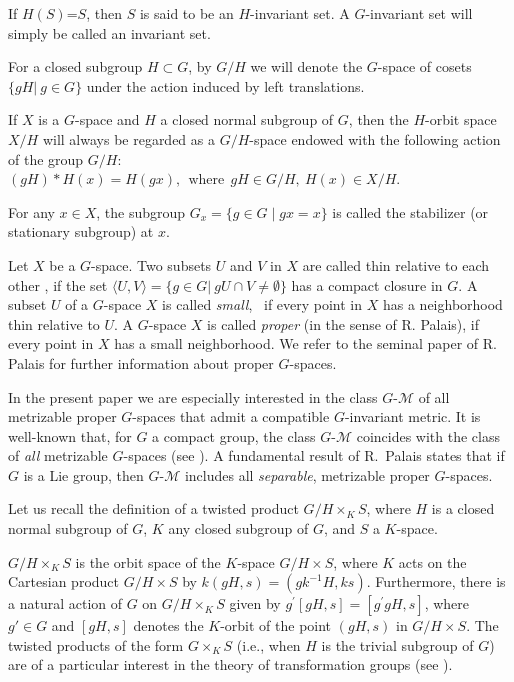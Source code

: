 \documentclass{amsart}
\begin{document}
If $H(S)$=$S$, then $S$ is said to be an $H$-invariant set. A  $G$-invariant set will simply be called an invariant set.  

For a closed subgroup $H \subset G$, by $G/H$ we will denote the $G$-space 
of cosets $\{gH | \ g\in G\}$ under the action induced by left translations.

If $X$ is a $G$-space and $H$  a closed normal subgroup of $G$, then the $H$-orbit space $X/H$  will always be regarded as a  $G/H$-space endowed with the following action of the group $G/H$:
$(gH)*H(x)=H(gx), \ \ \text{where} \ \ gH\in G/H, \ H(x)\in X/H$.

For any $x\in X$, the subgroup   $G_x =\{g\in G   \mid  gx=x\}$ is called  the stabilizer (or stationary subgroup) at $x$.

\smallskip

 Let  $X$ be  a $G$-space. Two subsets  $U$ and $V$ in  $X$  are called  thin relative to each other   \cite[Definition 1.1.1]{pal:61},  if the set 
$\langle U,V\rangle=\{g\in G | \ gU\cap V\ne \emptyset\}$
    has  a compact closure in $G$. 
   A subset $U$ of a $G$-space $X$ is called {\it small}, \ if  every point in $X$ has a neighborhood thin relative to $U$. A $G$-space $X$ 
is called  {\it  proper} (in the sense of R. Palais),  if   every point in  $X$ has a small neighborhood. We refer to the seminal paper of R. Palais \cite{pal:61} for further information about proper $G$-spaces.



\smallskip

In the present  paper we are especially interested in the class $G$-$\mathcal M$ of  all  metrizable proper $G$-spaces  that admit a compatible $G$-invariant metric. 
It is well-known that, for $G$ a compact group, the class $G$-$\mathcal M$
coincides with the class of {\it all} metrizable $G$-spaces (see \cite[Proposition 1.1.12]{pal:60}).
A  fundamental result of  R.~Palais \cite[Theorem~4.3.4]{pal:61}
states that if $G$ is a Lie group, then  $G$-$\mathcal M$ includes all {\it separable}, metrizable  proper $G$-spaces.




 Let us recall the definition of a twisted product $G/H\times_K S$, where $H$ is a closed normal subgroup of $G$,  $K$  any closed subgroup of $G$,  and   $S$  a $K$-space. 
 
$G/H\times_KS$ is the orbit space of the $K$-space $G/H\times S$, where $K$ acts on the Cartesian product $G/H\times S$ by $k(gH, s)=(gk^{-1}H, ks)$. Furthermore, there is a natural action of $G$ on $G/H\times_K S$ given by $g^\prime[gH, s]=[g^\prime gH, s]$, where $g'\in G$ and $[gH, s]$ denotes the  $K$-orbit of the point $(gH, s)$ in $G/H\times S$. The twisted products of the form $G\times_KS$ (i.e., when $H$ is  the trivial subgroup of $G$) are  of a particular interest in the theory of transformation groups (see \cite[Ch.~II, \S~2]{bre:72}). 
\end{document}
